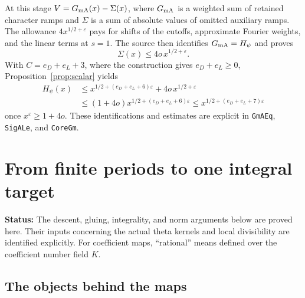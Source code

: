 \documentclass[11pt,a4paper]{article}
\numberwithin{equation}{section}
\theoremstyle{remark}\newtheorem{remark}[theorem]{Remark}
\newcommand{\status}[1]{\textbf{Status:} #1}
\begin{document}
At this stage $V=G_{\rm mA}(x)-\Sigma(x)$, where $G_{\rm mA}$ is a weighted sum of retained character ramps and $\Sigma$ is a sum of absolute values of omitted auxiliary ramps. The allowance $4x^{1/2+\varepsilon}$ pays for shifts of the cutoffs, approximate Fourier weights, and the linear terms at $s=1$. The source then identifies $G_{\rm mA}=H_\psi$ and proves
\[
\Sigma(x)\le4o\,x^{1/2+\varepsilon}.
\]
With $C=e_D+e_L+3$, where the construction gives $e_D+e_L\ge0$, Proposition~\ref{prop:scalar} yields
\begin{align*}
H_\psi(x)&\le x^{1/2+(e_D+e_L+6)\varepsilon}
                +4o\,x^{1/2+\varepsilon}\\
&\le(1+4o)x^{1/2+(e_D+e_L+6)\varepsilon}
 \le x^{1/2+(e_D+e_L+7)\varepsilon}
\end{align*}
once $x^\varepsilon\ge1+4o$. These identifications and estimates are explicit in \texttt{GmAEq}, \texttt{SigALe}, and \texttt{CoreGm}.\cite{coregm,gm,sigma}

\section{From finite periods to one integral target}\label{sec:period-lattice}

\status{The descent, gluing, integrality, and norm arguments below are proved here. Their inputs concerning the actual theta kernels and local divisibility are identified explicitly. For coefficient maps, ``rational'' means defined over the coefficient number field $K$.}

\subsection{The objects behind the maps}
\end{document}
